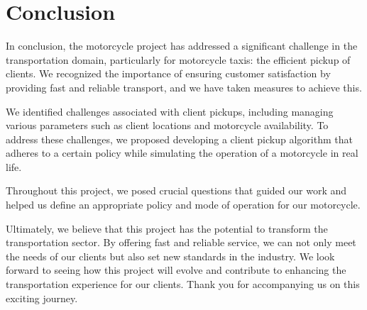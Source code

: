 \section{Conclusion}

In conclusion, the motorcycle project has addressed a significant challenge in the transportation domain, particularly for motorcycle taxis: the efficient pickup of clients. We recognized the importance of ensuring customer satisfaction by providing fast and reliable transport, and we have taken measures to achieve this.

We identified challenges associated with client pickups, including managing various parameters such as client locations and motorcycle availability. To address these challenges, we proposed developing a client pickup algorithm that adheres to a certain policy while simulating the operation of a motorcycle in real life.

Throughout this project, we posed crucial questions that guided our work and helped us define an appropriate policy and mode of operation for our motorcycle.

Ultimately, we believe that this project has the potential to transform the transportation sector. By offering fast and reliable service, we can not only meet the needs of our clients but also set new standards in the industry. We look forward to seeing how this project will evolve and contribute to enhancing the transportation experience for our clients. Thank you for accompanying us on this exciting journey.
